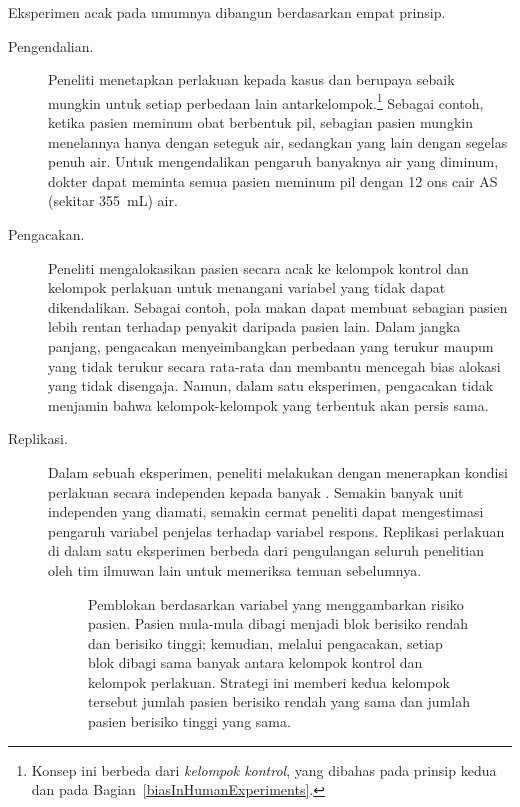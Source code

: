 \noindent{}Eksperimen acak pada umumnya dibangun berdasarkan empat prinsip.

\begin{description}
\item[Pengendalian.]
    Peneliti menetapkan perlakuan kepada kasus dan berupaya sebaik mungkin
    untuk  setiap perbedaan lain antarkelompok.\footnote{Konsep
      ini berbeda dari \emph{kelompok kontrol}, yang dibahas pada prinsip
      kedua dan pada Bagian~\ref{biasInHumanExperiments}.}
    Sebagai contoh, ketika pasien meminum obat berbentuk pil, sebagian pasien
    mungkin menelannya hanya dengan seteguk air, sedangkan yang lain dengan
    segelas penuh air. Untuk mengendalikan pengaruh banyaknya air yang diminum,
    dokter dapat meminta semua pasien meminum pil dengan 12 ons cair AS
    (sekitar 355~mL) air.
\item[Pengacakan.] Peneliti mengalokasikan pasien secara acak ke kelompok kontrol
    dan kelompok perlakuan untuk menangani variabel yang tidak dapat dikendalikan. Sebagai
    contoh, pola makan dapat membuat sebagian pasien lebih rentan terhadap
    penyakit daripada pasien lain. Dalam jangka panjang, pengacakan
    menyeimbangkan perbedaan yang terukur maupun yang tidak terukur secara
    rata-rata dan membantu mencegah bias alokasi yang tidak disengaja. Namun, dalam
    satu eksperimen, pengacakan tidak menjamin bahwa kelompok-kelompok yang
    terbentuk akan persis sama.
\item[Replikasi.] Dalam sebuah eksperimen, peneliti melakukan 
    dengan menerapkan kondisi perlakuan secara independen kepada banyak
    . Semakin banyak unit independen yang diamati,
    semakin cermat peneliti dapat mengestimasi pengaruh variabel penjelas
    terhadap variabel respons. Replikasi perlakuan di dalam satu eksperimen
    berbeda dari pengulangan seluruh penelitian oleh tim ilmuwan lain untuk
    memeriksa temuan sebelumnya.

\begin{figure}
  \centering
  \caption{Pemblokan berdasarkan variabel yang menggambarkan risiko pasien.
      Pasien mula-mula dibagi menjadi blok berisiko rendah dan berisiko tinggi;
      kemudian, melalui pengacakan, setiap blok dibagi sama banyak antara
      kelompok kontrol dan kelompok perlakuan. Strategi ini memberi kedua kelompok tersebut
      jumlah pasien berisiko rendah yang sama dan jumlah pasien berisiko
      tinggi yang sama.}
  \label{figureShowingBlocking}
\end{figure}


\end{description}
